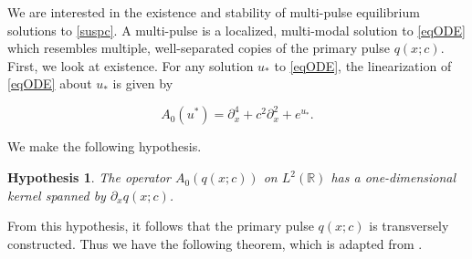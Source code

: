 \documentclass[12pt]{article}
\def\R{{\mathbb R}}
\newtheorem{hypothesis}{Hypothesis}
\begin{document}
We are interested in the existence and stability of multi-pulse equilibrium solutions to \eqref{suspc}. A multi-pulse is a localized, multi-modal solution to \eqref{eqODE} which resembles multiple, well-separated copies of the primary pulse $q(x; c)$. First, we look at existence. For any solution $u_*$ to \eqref{eqODE}, the linearization of \eqref{eqODE} about $u_*$ is given by

\begin{equation}\label{defA0}
A_0(u^*) = \partial_x^4 + c^2 \partial_x^2 + e^{u_*}.
\end{equation}

We make the following hypothesis.

\begin{hypothesis}\label{A0kernel}
The operator $A_0(q(x; c))$ on $L^2(\R)$ has a one-dimensional kernel spanned by $\partial_x q(x; c)$.
\end{hypothesis}

From this hypothesis, it follows that the primary pulse $q(x; c)$ is transversely constructed. Thus we have the following theorem, which is adapted from \cite[Theorem 3.6]{Sandstede1997}.
\end{document}
